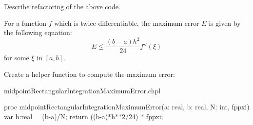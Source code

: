 \begin{TODO}
  Describe refactoring of the above code.
\end{TODO}

For a function $f$ which is twice differentiable, the maximum error $E$ is given by
the following equation:
\begin{equation}
E \leq \frac{(b-a)h^2}{24} f''(\xi) \label{eq:rectangle-max-error}
\end{equation}
for some $\xi$ in $[a,b]$.

Create a helper function to compute the maximum error:
\begin{chapelhelper}{midpointRectangularIntegrationMaximumError.chpl}
\begin{chapel}
proc midpointRectangularIntegrationMaximumError(a: real, b: real, N: int, fppxi){
  var h:real = (b-a)/N;
  return ((b-a)*h**2/24) * fppxi;
}
\end{chapel}
\end{chapelhelper}
